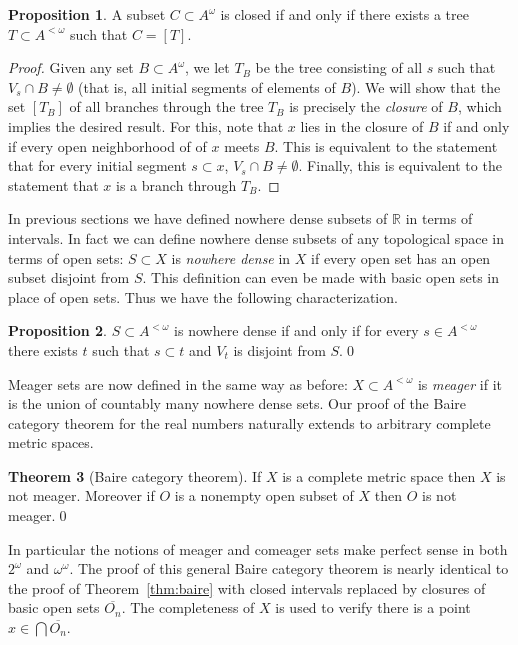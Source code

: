 \documentclass[11pt,oneside]{amsart}
\newcommand{\RR}{\mathbb R}
\theoremstyle{definition}
\newtheorem{thm}{Theorem}[section]
\newtheorem{prop}[thm]{Proposition}
\theoremstyle{definition}
\theoremstyle{remark}
\begin{document}
\begin{prop}
  A subset $C\subset A^\omega$ is closed if and only if there exists a tree $T\subset A^{<\omega}$ such that $C=[T]$.
\end{prop}

\begin{proof}
  Given any set $B\subset A^\omega$, we let $T_B$ be the tree consisting of all $s$ such that $V_s\cap B\neq\emptyset$ (that is, all initial segments of elements of $B$). We will show that the set $[T_B]$ of all branches through the tree $T_B$ is precisely the \emph{closure} of $B$, which implies the desired result. For this, note that $x$ lies in the closure of $B$ if and only if every open neighborhood of of $x$ meets $B$. This is equivalent to the statement that for every initial segment $s\subset x$, $V_s\cap B\neq\emptyset$. Finally, this is equivalent to the statement that $x$ is a branch through $T_B$.
\end{proof}

In previous sections we have defined nowhere dense subsets of $\RR$ in terms of intervals. In fact we can define nowhere dense subsets of any topological space in terms of open sets: $S\subset X$ is \emph{nowhere dense} in $X$ if every open set has an open subset disjoint from $S$. This definition can even be made with basic open sets in place of open sets. Thus we have the following characterization.

\begin{prop}
  $S\subset A^{<\omega}$ is nowhere dense if and only if for every $s\in A^{<\omega}$ there exists $t$ such that $s\subset t$ and $V_t$ is disjoint from $S$.\qed
\end{prop}

Meager sets are now defined in the same way as before: $X\subset A^{<\omega}$ is \emph{meager} if it is the union of countably many nowhere dense sets. Our proof of the Baire category theorem for the real numbers naturally extends to arbitrary complete metric spaces.

\begin{thm}[Baire category theorem]
  If $X$ is a complete metric space then $X$ is not meager. Moreover if $O$ is a nonempty open subset of $X$ then $O$ is not meager.\qed
\end{thm}

In particular the notions of meager and comeager sets make perfect sense in both $2^\omega$ and $\omega^\omega$. The proof of this general Baire category theorem is nearly identical to the proof of Theorem~\ref{thm:baire} with closed intervals replaced by closures of basic open sets $\overline{O_n}$. The completeness of $X$ is used to verify there is a point $x\in\bigcap\overline{O_n}$.
\end{document}
